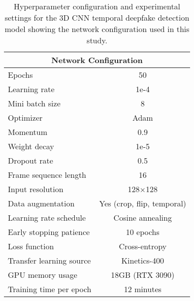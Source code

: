 \documentclass[conference]{IEEEtran}
\begin{document}
\begin{table}[!ht]
\centering
\caption{Hyperparameter configuration and experimental settings for the 3D CNN temporal deepfake detection model showing the network configuration used in this study.}
\label{tab:ModelArchitecture} 
\begin{tabular}{|l|c|}
\hline
\multicolumn{2}{|c|}{\textbf{Network Configuration}} 
\\ \hline
Epochs & 50 \\
Learning rate & 1e-4 \\
Mini batch size & 8 \\ 
Optimizer & Adam \\
Momentum & 0.9 \\
Weight decay & 1e-5 \\
Dropout rate & 0.5 \\
Frame sequence length & 16 \\
Input resolution & 128×128 \\
Data augmentation & Yes (crop, flip, temporal) \\
Learning rate schedule & Cosine annealing \\
Early stopping patience & 10 epochs \\
Loss function & Cross-entropy \\
Transfer learning source & Kinetics-400 \\
GPU memory usage & 18GB (RTX 3090) \\
Training time per epoch & 12 minutes \\
\hline
\end{tabular}
\end{table}




\end{document}
